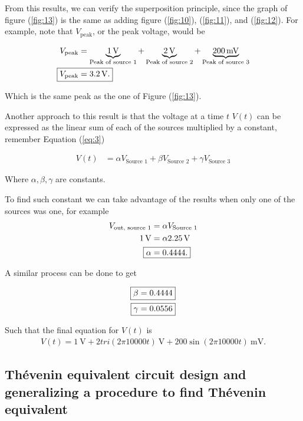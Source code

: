 \documentclass[english,12pt]{article}
\begin{document}
From this results, we can verify the superposition principle, since the graph of figure (\ref{fig:13}) is the same as adding figure (\ref{fig:10}), (\ref{fig:11}), and (\ref{fig:12}). For example, note that $V_{\text{peak}}$, or the peak voltage, would be

\begin{align*}
    V_{\text{peak}} &= \underbrace{\SI{1}{\volt}}_{\text{Peak of source 1}} + \underbrace{\SI{2}{\volt}}_{\text{Peak of source 2}}+ \underbrace{\SI{200}{\milli\volt}}_{\text{Peak of source 3}}\\
    \Aboxed{V_{\text{peak}} &= \SI{3.2}{\volt}.}
\end{align*}

Which is the same peak as the one of Figure (\ref{fig:13}).

Another approach to this result is that the voltage at a time $t$ $V(t)$ can be expressed as the linear sum of each of the sources multiplied by a constant, remember Equation (\ref{eq:3})

\begin{align*}
    V(t) &= \alpha V_\text{Source 1} + \beta V_\text{Source 2} + \gamma V_\text{Source 3}
\end{align*}

Where $\alpha,\beta,\gamma$ are constants.

To find such constant we can take advantage of the results when only one of the sources was one, for example
 \begin{align*}
    V_\text{out, source 1} &= \alpha V_\text{Source 1}\\
     \SI{1}{\volt} &= \alpha \SI{2.25}{\volt}\\
     \Aboxed{\alpha &= 0.4444.}
 \end{align*}

 A similar process can be done to get

 \begin{align*}
     \Aboxed{\beta &= 0.4444}\\
     \Aboxed{\gamma &= 0.0556}
 \end{align*}

 Such that the final equation for $V(t)$ is
 \begin{align*}
     V(t) = \SI{1}{\volt} + 2tri(2\pi10000t) \SI{}{\volt} + 200\sin(2\pi10000t) \SI{}{\milli\volt}.
 \end{align*}
 \newpage
\subsection{Thévenin equivalent circuit design and generalizing a procedure to find Thévenin equivalent}
\end{document}
